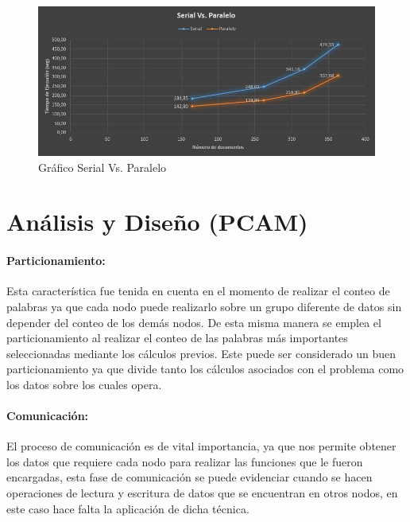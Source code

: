 \documentclass[fleqn,10pt]{SelfArx} %
\begin{document}

\begin{figure}[ht]\centering %
	\includegraphics[width=\linewidth]{graficoSerialParalelo}
	\caption{Gráfico Serial Vs. Paralelo}
	\label{fig:graficoSerialParalelo}
\end{figure}


\section{Análisis y Diseño (PCAM)}

\paragraph{Particionamiento:}
Esta característica fue tenida en cuenta en el momento de realizar el conteo de palabras ya que cada nodo puede realizarlo sobre un grupo diferente de datos sin depender del conteo de los demás nodos. 
De esta misma manera se emplea el particionamiento al realizar el conteo de las palabras más importantes seleccionadas  mediante los cálculos previos.
Este puede ser considerado un buen particionamiento ya que divide tanto los cálculos asociados con el problema como los datos sobre los cuales opera.

\paragraph{Comunicación:}
El proceso de comunicación es de vital importancia, ya que nos permite obtener los datos que requiere cada nodo para realizar las funciones que le fueron encargadas, esta fase de comunicación se puede evidenciar cuando se hacen operaciones de lectura y escritura de datos que se encuentran en otros nodos, en este caso hace falta la aplicación de dicha técnica.
\end{document}
